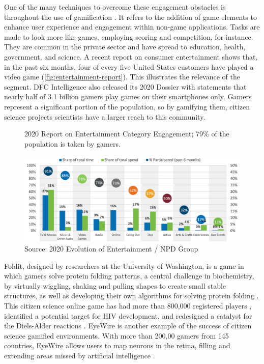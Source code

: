 One of the many techniques to overcome these engagement obstacles is throughout the use of gamification \cite{bowser2013using}. It refers to the addition of game elements to enhance user experience and engagement within non-game applications. Tasks are made to look more like games, employing scoring and competition, for instance. They are common in the private sector and have spread to education, health, government, and science. A recent report on consumer entertainment shows that, in the past six months, four of every five United States customers have played a video game (\autoref{fig:entertainment-report}). This illustrates the relevance of the segment. DFC Intelligence also released its 2020 Dossier with statements that nearly half of 3.1 billion gamers play games on their smartphones only. Gamers represent a significant portion of the population, so by gamifying them, citizen science projects scientists have a larger reach to this community.

\begin{figure}[ht]
    \centering
    \caption{2020 Report on Entertainment Category Engagement; 79\% of the population is taken by gamers.}
    \includegraphics[width=\linewidth]{images/game.png}
    \caption*{Source: 2020 Evolution of Entertainment / NPD Group}
    \label{fig:entertainment-report}
\end{figure}

Foldit, designed by researchers at the University of Washington, is a game in which gamers solve protein folding patterns, a central challenge in biochemistry, by virtually wiggling, shaking and pulling shapes to create small stable structures, as well as developing their own algorithms for solving protein folding \cite{bourzac2008enlisting}. This citizen science online game has had more than 800,000 registered players \cite{foldit2021players}, identified a potential target for HIV development, and redesigned a catalyst for the Diels-Alder reactions \cite{kreitmair2019citizen}. EyeWire is another example of the success of citizen science gamified environments. With more than 200,00 gamers from 145 countries, EyeWire allows users to map neurons in the retina, filling and extending areas missed by artificial intelligence \cite{kreitmair2019citizen}.

